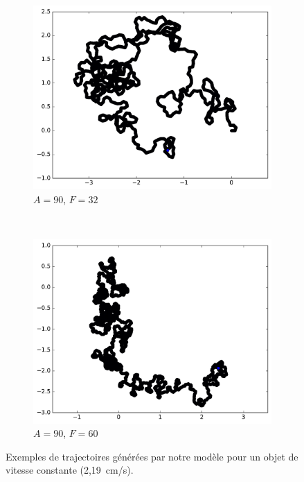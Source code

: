 \begin{figure}[htb]
\begin{subfigure}[t]{\subImgWmo}
			\includegraphics[width=\textwidth]{figures/ch3/synTraj_219_90_32}
			\caption[$A = 90$, $F=32$]{$A = 90$, $F=32$}
			\label{fig:synTraj_219_90_32}
		\end{subfigure}
		~
		\begin{subfigure}[t]{\subImgWmo}
			\centering
			\includegraphics[width=\textwidth]{figures/ch3/synTraj_219_90_60}
			\caption[$A = 90$, $F=60$]{$A = 90$, $F=60$}
			\label{fig:synTraj_219_90_60}
		\end{subfigure}
		\caption[Mouvements générés par notre modèle -- III]{Exemples de trajectoires générées par notre modèle pour un objet de vitesse constante (2,19~cm/s).}
		\label{fig:motion7590}
	\end{figure}
	
